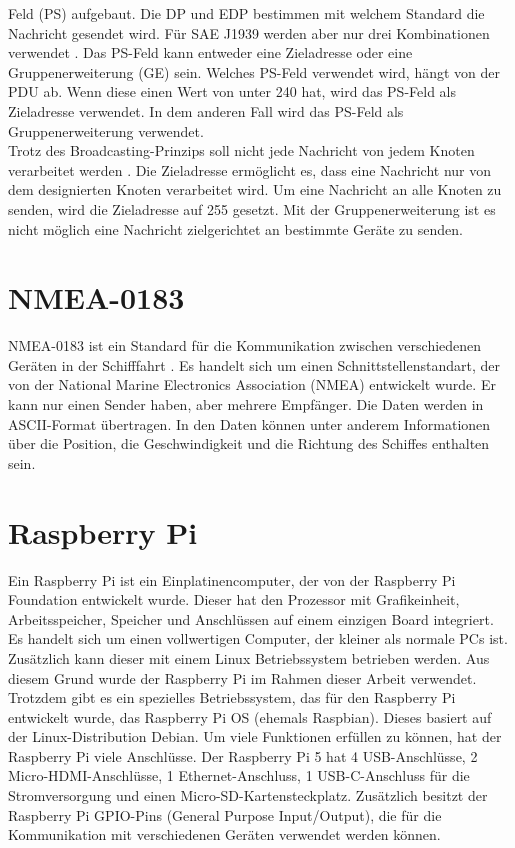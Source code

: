 Feld (PS) aufgebaut. Die DP und EDP bestimmen mit welchem Standard die 
Nachricht gesendet wird. Für SAE J1939 werden aber nur drei Kombinationen verwendet \cite{VectorSAE}.
Das PS-Feld kann entweder eine Zieladresse oder eine Gruppenerweiterung (GE) sein. Welches PS-Feld
verwendet wird, hängt von der PDU ab. Wenn diese einen Wert von unter 240 hat, wird das PS-Feld als Zieladresse verwendet. 
In dem anderen Fall wird das PS-Feld als Gruppenerweiterung verwendet. \\
Trotz des Broadcasting-Prinzips soll nicht jede Nachricht von jedem Knoten verarbeitet werden \cite{Murvay2018}.
Die Zieladresse ermöglicht es, dass eine Nachricht nur von dem designierten Knoten verarbeitet wird.
Um eine Nachricht an alle Knoten 
zu senden, wird die Zieladresse auf 255 gesetzt. Mit der Gruppenerweiterung ist es nicht möglich eine Nachricht 
zielgerichtet an bestimmte Geräte zu senden. 


\section{NMEA-0183}
NMEA-0183 ist ein Standard für die Kommunikation zwischen verschiedenen Geräten in der Schifffahrt \cite{nmea0183}. Es handelt sich um
einen Schnittstellenstandart, der von der National Marine Electronics Association (NMEA) entwickelt wurde. 
Er kann nur einen Sender haben, aber mehrere Empfänger. Die Daten werden in ASCII-Format übertragen. In den Daten 
können unter anderem Informationen über die Position, die Geschwindigkeit und die Richtung des Schiffes enthalten sein.

\section{Raspberry Pi} \label{sec:raspberrypi}
Ein Raspberry Pi ist ein Einplatinencomputer, der von der Raspberry Pi Foundation entwickelt wurde. 
Dieser hat den Prozessor mit Grafikeinheit, Arbeitsspeicher, Speicher und Anschlüssen auf einem einzigen Board integriert.
Es handelt sich um einen vollwertigen Computer, der kleiner als normale PCs ist. Zusätzlich kann dieser mit einem Linux Betriebssystem
betrieben werden. Aus diesem Grund wurde der Raspberry Pi im Rahmen dieser Arbeit verwendet.
Trotzdem gibt es ein spezielles Betriebssystem, das für den Raspberry Pi entwickelt wurde, das Raspberry Pi OS (ehemals Raspbian).
Dieses basiert auf der Linux-Distribution Debian. Um viele Funktionen erfüllen zu können, hat der Raspberry Pi viele Anschlüsse.
Der Raspberry Pi 5 hat 4 USB-Anschlüsse, 2 Micro-HDMI-Anschlüsse, 1 Ethernet-Anschluss, 1 USB-C-Anschluss 
für die Stromversorgung und einen Micro-SD-Kartensteckplatz. Zusätzlich besitzt der Raspberry Pi GPIO-Pins (General Purpose Input/Output),
die für die Kommunikation mit verschiedenen Geräten verwendet werden können.